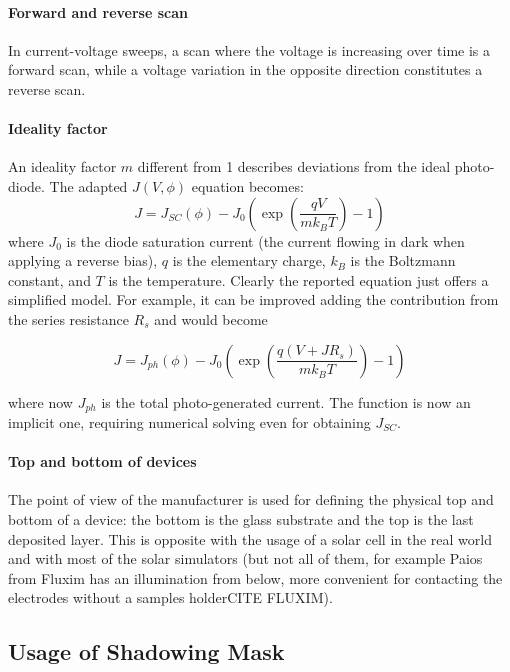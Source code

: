 		\paragraph{Forward and reverse scan} In current-voltage sweeps, a scan where the voltage is increasing over time is a forward scan, while a voltage variation in the opposite direction constitutes a reverse scan.

		\paragraph{Ideality factor} An ideality factor $m$ different from 1 describes deviations from the ideal photo-diode. The adapted $J(V,\phi)$ equation becomes\cite{Calado2018b}:
		\begin{equation} \label{eq:photodiode}
			J = J_{SC}(\phi) - J_0\left(\exp\left(\frac{qV}{mk_BT}\right)-1\right)
		\end{equation}
		where $J_0$ is the diode saturation current (the current flowing in dark when applying a reverse bias), $q$ is the elementary charge, $k_B$ is the Boltzmann constant, and $T$ is the temperature.  Clearly the reported equation just offers a simplified model. For example, it can be improved adding the contribution from the series resistance $R_s$ and would become

		$$J = J_{ph}(\phi) - J_0\left(\exp\left(\frac{q(V+JR_s)}{mk_BT}\right)-1\right)$$

		where now $J_{ph}$ is the total photo-generated current. The function is now an implicit one, requiring numerical solving even for obtaining $J_{SC}$.

		\paragraph{Top and bottom of devices} The point of view of the manufacturer is used for defining the physical top and bottom of a device: the bottom is the glass substrate and the top is the last deposited layer. This is opposite with the usage of a solar cell in the real world and with most of the solar simulators (but not all of them, for example Paios from Fluxim has an illumination from below, more convenient for contacting the electrodes without a samples holderCITE FLUXIM).

	\subsection{Usage of Shadowing Mask}

